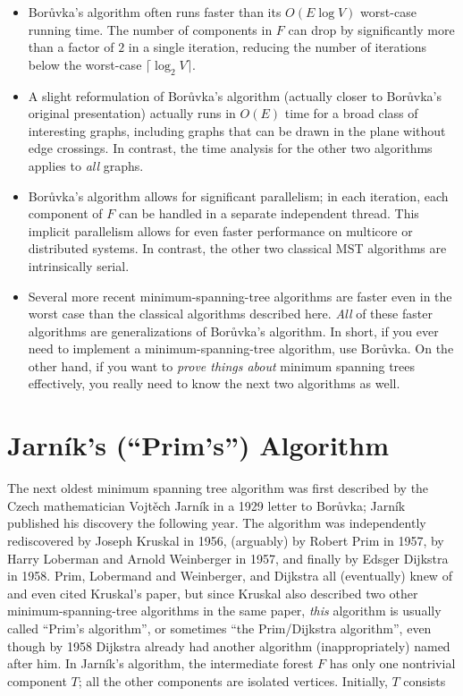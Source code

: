 \begin{itemize}
\item Borůvka’s algorithm often runs faster than its $O(E \log  V)$ worst-case running time. The number of components in $F$ can drop by significantly more than a factor of $2$ in a single iteration, reducing the number of iterations below the worst-case $\lceil \log_2 V \rceil$.
\end{itemize}

\begin{itemize}
\item A slight reformulation of Borůvka’s algorithm (actually closer to Borůvka’s original presentation) actually runs in $O(E)$ time for a broad class of interesting graphs, including graphs that can be drawn in the plane without edge crossings. In contrast, the time analysis for the other two algorithms applies to \textit{all} graphs.
\item Borůvka’s algorithm allows for significant parallelism; in each iteration, each component of $F$ can be handled in a separate independent thread. This implicit parallelism allows for even faster performance on multicore or distributed systems. In contrast, the other two classical MST algorithms are intrinsically serial.
\item Several more recent minimum-spanning-tree algorithms are faster even in the worst case than the classical algorithms described here. \textit{All} of these faster algorithms are generalizations of Borůvka’s algorithm. In short, if you ever need to implement a minimum-spanning-tree algorithm, use Borůvka. On the other hand, if you want to \textit{prove things about} minimum spanning trees effectively, you really need to know the next two algorithms as well.
\end{itemize}

\section{Jarník’s (“Prim’s”) Algorithm}
\label{sec:7.4}

The next oldest minimum spanning tree algorithm was first described by the Czech mathematician Vojtěch Jarník in a 1929 letter to Borůvka; Jarník published his discovery the following year. The algorithm was independently rediscovered by Joseph Kruskal in 1956, (arguably) by Robert Prim in 1957, by Harry Loberman and Arnold Weinberger in 1957, and finally by Edsger Dijkstra in 1958. Prim, Lobermand and Weinberger, and Dijkstra all (eventually) knew of and even cited Kruskal’s paper, but since Kruskal also described two other minimum-spanning-tree algorithms in the same paper, \textit{this} algorithm is usually called “Prim’s algorithm”, or sometimes “the Prim/Dijkstra algorithm”, even though by 1958 Dijkstra already had another algorithm (inappropriately) named after him. In Jarník’s algorithm, the intermediate forest $F$ has only one nontrivial component $T$; all the other components are isolated vertices. Initially, $T$ consists

